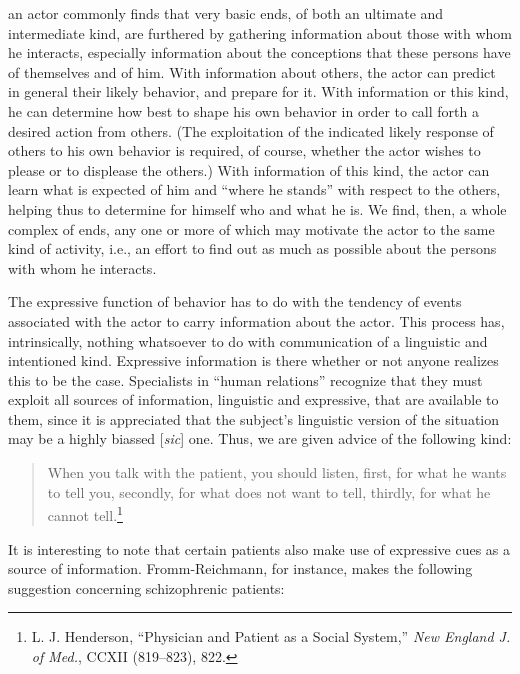 \documentclass[openany,nobib]{tufte-book}
\begin{document}
an actor commonly finds that very basic ends, of both an
ultimate and intermediate kind, are furthered by gathering information
about those with whom he interacts, es­pecially information about the
conceptions that these persons have of themselves and of him. With
information about others, the actor can predict in general their likely
behavior, and pre­pare for it. With information or this kind, he can
determine how best to shape his own behavior in order to call forth a
desired action from others. (The exploitation of the indicated likely
response of others to his own behavior is required, of course, whether
the actor wishes to please or to displease the others.) With information
of this kind, the actor can learn what is expected of him and ``where he
stands'' with respect to the others, helping thus to determine for
himself who and what he is. We find, then, a whole complex of ends, any
one or more of which may motivate the actor to the same kind of
activity, i.e., an effort to find out as much as possible about the
persons with whom he interacts.

The expressive function of behavior has to do with the tendency of
events associated with the actor to carry information about the actor.
This process has, intrinsically, nothing whatsoever to do with
communication of a linguistic and intentioned kind. Expressive
information is there whether or not anyone realizes this to be the case.
Specialists in ``human relations'' recognize that they must exploit all
sources of information, linguistic and expressive, that are available to
them, since it is appreciated that the subject's linguistic version of
the situation may be a highly biassed {[}\emph{sic}{]} one. Thus, we are
given advice of the following kind:

\begin{quote}
When you talk with the patient, you should listen, first, for what he
wants to tell you, secondly, for what does not want to tell, thirdly,
for what he cannot tell.\footnote{L. J. Henderson, ``Physician and
  Patient as a Social System,'' \emph{New England J. of Med.}, CCXII
  (819--823), 822.}
\end{quote}

\noindent It is interesting to note that certain patients also make use of
expressive cues as a source of information. Fromm-Reichmann, for
instance, makes the following suggestion concerning schizophrenic
patients:
\end{document}
